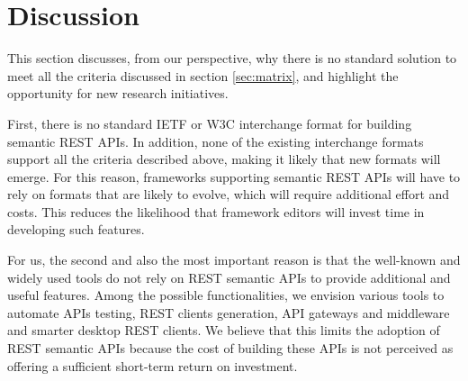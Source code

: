 \section{Discussion} \label{sec:discussion}


This section discusses, from our perspective, why there is no standard solution to meet all the criteria discussed in section \ref{sec:matrix}, and highlight the opportunity for new research initiatives. 

First, there is no standard IETF or W3C interchange format for building semantic REST APIs. In addition, none of the existing interchange formats support all the criteria described above, making it likely that new formats will emerge.
For this reason, frameworks supporting semantic REST APIs will have to rely on formats that are likely to evolve, which will require additional effort and costs. This reduces the likelihood that framework editors will invest time in developing such features. 

For us, the second and also the most important reason is that the well-known and widely used tools do not rely on REST semantic APIs to provide additional and useful features. Among the possible functionalities, we envision various tools to automate APIs testing, REST clients generation, API gateways and middleware and smarter desktop REST clients.
We believe that this limits the adoption of REST semantic APIs because the cost of building these APIs is not perceived as offering a sufficient short-term return on investment.



